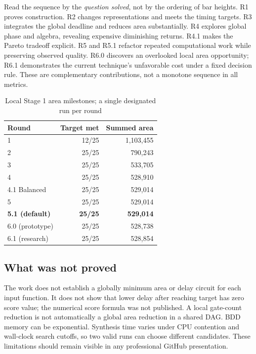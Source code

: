 \documentclass[a4paper,10pt]{article}
\theoremstyle{definition}
\theoremstyle{remark}
\begin{document}
Read the sequence by the \emph{question solved}, not by the ordering of bar heights. R1 proves construction. R2 changes representations and meets the timing targets. R3 integrates the global deadline and reduces area substantially. R4 explores global phase and algebra, revealing expensive diminishing returns. R4.1 makes the Pareto tradeoff explicit. R5 and R5.1 refactor repeated computational work while preserving observed quality. R6.0 discovers an overlooked local area opportunity; R6.1 demonstrates the current technique's unfavorable cost under a fixed decision rule. These are complementary contributions, not a monotone sequence in all metrics.

\begin{table}[H]\centering\small\caption{Local Stage 1 area milestones; a single designated run per round}\begin{tabular}{@{}lrr@{}}\toprule
Round & Target met & Summed area \\ \midrule
1 &12/25&1,103,455\\
2 &25/25&790,243\\
3 &25/25&533,705\\
4 &25/25&528,910\\
4.1 Balanced &25/25&529,014\\
5 &25/25&529,014\\
\textbf{5.1 (default)}&\textbf{25/25}&\textbf{529,014}\\
6.0 (prototype)&25/25&528,738\\
6.1 (research)&25/25&528,854\\ \bottomrule\end{tabular}\end{table}

\subsection{What was not proved}
The work does not establish a globally minimum area or delay circuit for each input function. It does not show that lower delay after reaching target has zero score value; the numerical score formula was not published. A local gate-count reduction is not automatically a global area reduction in a shared DAG. BDD memory can be exponential. Synthesis time varies under CPU contention and wall-clock search cutoffs, so two valid runs can choose different candidates. These limitations should remain visible in any professional GitHub presentation.
\end{document}
